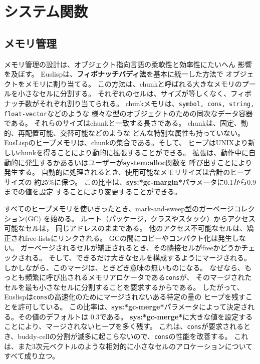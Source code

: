 \section{システム関数}

\subsection{メモリ管理}
メモリ管理の設計は、オブジェクト指向言語の柔軟性と効率性にたいへん
影響を及ぼす。
Euslispは、{\bf フィボナッチバディ法}を基本に統一した方法で
オブジェクトをメモリに割り当てる。
この方法は、chunkと呼ばれる大きなメモリのプールを小さなセルに分割する。
それぞれのセルは、サイズが等しくなく、フィボナッチ数がそれぞれ割り当てられる。
chunkメモリは、{\tt symbol, cons, string, float-vector}などのような
様々な型のオブジェクトのための同次なデータ容器である。
それらのサイズはchunkと一致する長さである。
chunkは、固定、動的、再配置可能、交替可能などのような
どんな特別な属性も持っていない。
EusLispのヒープメモリは、chunkの集合である。そして、
ヒープはUNIXより新しいchunkを得ることにより動的に拡張することができる。
拡張は、動作中に自動的に発生するかあるいはユーザーが{\bf system:alloc}関数を
呼び出すことにより発生する。
自動的に処理されるとき、使用可能なメモリサイズは合計のヒープサイズの
約25\%に保つ。%
この比率は、{\bf sys:*gc-margin*}パラメータに0.1から0.9までの値を設定
することにより変更することができる。

すべてのヒープメモリを使いきったとき、mark-and-sweep型のガーベージコレクション(GC)
を始める。
ルート（パッケージ，クラスやスタック）からアクセス可能なセルは，
同じアドレスのままである。
他のアクセス不可能なセルは、矯正されfree-listsにリンクされる。
GCの間にコピーやコンパクト化は発生しない。
ガーベージされるセルが矯正されるとき、その隣接セルがfreeかどうかチェックされる。
そして、できるだけ大きなセルを構成するようにマージされる。
しかしながら、このマージは、ときどき意味の無いものになる。
なぜなら、もっとも頻繁に呼び出されるメモリアロケータである{\tt cons}が、
そのマージされたセルを最も小さなセルに分割することを要求するからである。
したがって、Euslispは{\tt cons}の高速化のためにマージされないある特定の量の
ヒープを残すことを許可している。
この比率は、{\bf sys:*gc-merge*}パラメータによって決定される。その値のデフォルトは
0.3である。
{\bf sys:*gc-merge*}に大きな値を設定することにより、マージされないヒープを多く残す。
これは、{\tt cons}が要求されるとき、buddy-cellの分割が滅多に起こらないので、{\tt cons}の性能を改善する。
これは、また3次元ベクトルのような相対的に小さなセルのアロケーションについて
すべて成り立つ。

